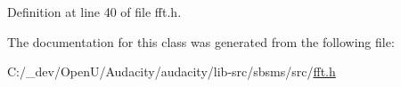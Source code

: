 Definition at line 40 of file fft.\+h.



The documentation for this class was generated from the following file\+:\begin{DoxyCompactItemize}
\item 
C\+:/\+\_\+dev/\+Open\+U/\+Audacity/audacity/lib-\/src/sbsms/src/\hyperlink{lib-src_2sbsms_2src_2fft_8h}{fft.\+h}\end{DoxyCompactItemize}
